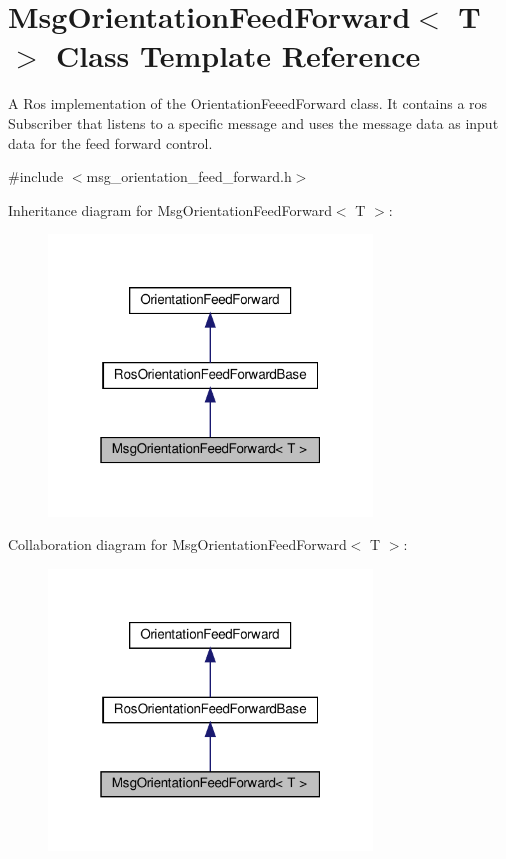 \hypertarget{classMsgOrientationFeedForward}{}\section{Msg\+Orientation\+Feed\+Forward$<$ T $>$ Class Template Reference}
\label{classMsgOrientationFeedForward}


A Ros implementation of the Orientation\+Feeed\+Forward class. It contains a ros Subscriber that listens to a specific message and uses the message data as input data for the feed forward control.  




{\ttfamily \#include $<$msg\+\_\+orientation\+\_\+feed\+\_\+forward.\+h$>$}



Inheritance diagram for Msg\+Orientation\+Feed\+Forward$<$ T $>$\+:\nopagebreak
\begin{figure}[H]
\begin{center}
\leavevmode
\includegraphics[width=244pt]{d0/d5b/classMsgOrientationFeedForward__inherit__graph}
\end{center}
\end{figure}


Collaboration diagram for Msg\+Orientation\+Feed\+Forward$<$ T $>$\+:\nopagebreak
\begin{figure}[H]
\begin{center}
\leavevmode
\includegraphics[width=244pt]{d2/d75/classMsgOrientationFeedForward__coll__graph}
\end{center}
\end{figure}

